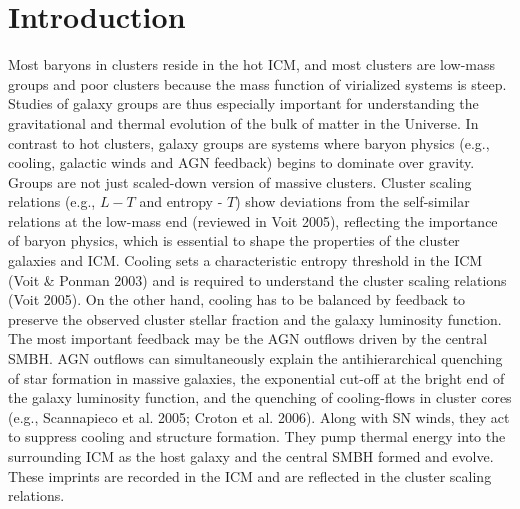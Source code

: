 \documentclass{aastex}
\begin{document}

\section{Introduction}

Most baryons in clusters reside in the hot ICM,
and most clusters are low-mass groups and poor clusters because the mass function
of virialized systems is steep.
Studies of galaxy groups are thus especially important for understanding the
gravitational and thermal evolution of the bulk of matter in the Universe.
In contrast to hot clusters, galaxy groups are systems where baryon physics
(e.g., cooling, galactic winds and AGN feedback) begins to dominate
over gravity. Groups are not just scaled-down version of massive clusters.
Cluster scaling relations (e.g., $L - T$ and entropy - $T$) show
deviations from the self-similar relations at the low-mass end (reviewed
in Voit 2005), reflecting the importance of baryon physics, which
is essential to shape the properties of the cluster galaxies
and ICM. Cooling sets a characteristic entropy threshold
in the ICM (Voit \& Ponman 2003) and is required to understand the cluster
scaling relations (Voit 2005). On the other hand, cooling has to be balanced
by feedback to preserve the observed cluster stellar fraction and the galaxy luminosity
function. The most important feedback may be the AGN outflows driven by the
central SMBH. AGN outflows can simultaneously explain the antihierarchical
quenching of star formation in massive galaxies, the exponential cut-off
at the bright end of the galaxy luminosity function, and the quenching of
cooling-flows in cluster cores (e.g., Scannapieco et al. 2005; Croton et al. 2006).
Along with SN winds, they act to suppress cooling and structure formation.
They pump thermal energy into the surrounding ICM as the host galaxy and the
central SMBH formed
and evolve. These imprints are recorded in the ICM and are reflected in
the cluster scaling relations.
\end{document}
